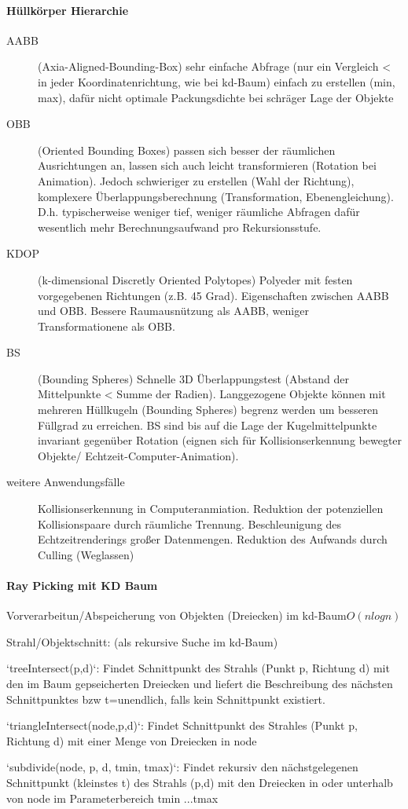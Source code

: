 \documentclass[landscape]{article}
\begin{document}
\begin{multicols}{3}
  \paragraph*{Hüllkörper Hierarchie}
  \begin{description}
    \item[AABB] (Axia-Aligned-Bounding-Box) sehr einfache Abfrage (nur ein Vergleich < in jeder Koordinatenrichtung, wie bei kd-Baum) einfach zu erstellen (min, max), dafür nicht optimale Packungsdichte bei schräger Lage der Objekte
    \item[OBB] (Oriented Bounding Boxes) passen sich besser der räumlichen Ausrichtungen an, lassen sich auch leicht transformieren (Rotation bei Animation). Jedoch schwieriger zu erstellen (Wahl der Richtung), komplexere Überlappungsberechnung (Transformation, Ebenengleichung). D.h. typischerweise weniger tief, weniger räumliche Abfragen dafür wesentlich mehr Berechnungsaufwand pro Rekursionsstufe.
    \item[KDOP] (k-dimensional Discretly Oriented Polytopes) Polyeder mit festen vorgegebenen Richtungen (z.B. 45 Grad). Eigenschaften zwischen AABB und OBB. Bessere Raumausnützung als AABB, weniger Transformationene als OBB.
    \item[BS] (Bounding Spheres) Schnelle 3D Überlappungstest (Abstand der Mittelpunkte < Summe der Radien). Langgezogene Objekte können mit mehreren Hüllkugeln (Bounding Spheres) begrenz werden um besseren Füllgrad zu erreichen. BS sind bis auf die Lage der Kugelmittelpunkte invariant gegenüber Rotation (eignen sich für Kollisionserkennung bewegter Objekte/ Echtzeit-Computer-Animation).
    \item[weitere Anwendungsfälle] Kollisionserkennung in Computeranmiation. Reduktion der potenziellen Kollisionspaare durch räumliche Trennung. Beschleunigung des Echtzeitrenderings großer Datenmengen. Reduktion des Aufwands durch Culling (Weglassen)
  \end{description}
  
  \paragraph{Ray Picking mit KD Baum}
  \begin{itemize*}
    \item Vorverarbeitun/Abspeicherung von Objekten (Dreiecken) im kd-Baum$O(n log n)$
    \item Strahl/Objektschnitt: (als rekursive Suche im kd-Baum)
    \item `treeIntersect(p,d)`: Findet Schnittpunkt des Strahls (Punkt p, Richtung d) mit den im Baum gepseicherten Dreiecken und liefert die Beschreibung des nächsten Schnittpunktes bzw t=unendlich, falls kein Schnittpunkt existiert.
    \item `triangleIntersect(node,p,d)`: Findet Schnittpunkt des Strahles (Punkt p, Richtung d) mit einer Menge von Dreiecken in node
    \item `subdivide(node, p, d, tmin, tmax)`: Findet rekursiv den nächstgelegenen Schnittpunkt (kleinstes t) des Strahls (p,d) mit den Dreiecken in oder unterhalb von node im Parameterbereich tmin ...tmax
  \end{itemize*}
  

\end{multicols}
\end{document}
